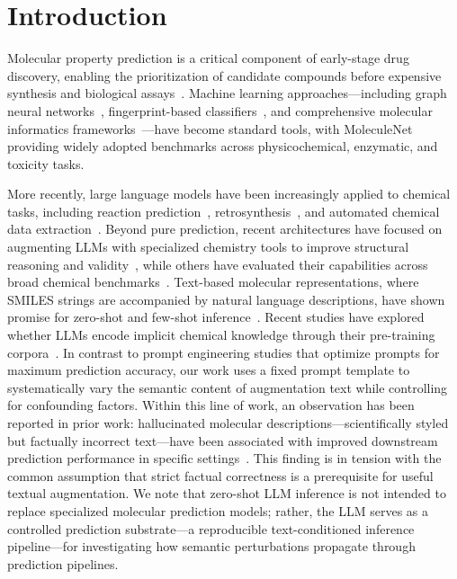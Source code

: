 \section{Introduction}

Molecular property prediction is a critical component of early-stage drug discovery, enabling the prioritization of candidate compounds before expensive synthesis and biological assays~\cite{vamathevan2019applications}. Machine learning approaches---including graph neural networks~\cite{gilmer2017neural}, fingerprint-based classifiers~\cite{rogers2010extended}, and comprehensive molecular informatics frameworks~\cite{jimenez2020drug}---have become standard tools, with MoleculeNet~\cite{wu2018moleculenet} providing widely adopted benchmarks across physicochemical, enzymatic, and toxicity tasks.

More recently, large language models have been increasingly applied to chemical tasks, including reaction prediction~\cite{schwaller2019molecular}, retrosynthesis~\cite{han2024retrosynthesis}, and automated chemical data extraction~\cite{polak2024extracting}. Beyond pure prediction, recent architectures have focused on augmenting LLMs with specialized chemistry tools to improve structural reasoning and validity~\cite{bran2024chemcrow}, while others have evaluated their capabilities across broad chemical benchmarks~\cite{guo2023benchmark, ross2022large}. Text-based molecular representations, where SMILES strings are accompanied by natural language descriptions, have shown promise for zero-shot and few-shot inference~\cite{edwards2022text2mol}. Recent studies have explored whether LLMs encode implicit chemical knowledge through their pre-training corpora~\cite{white2023assessment}. In contrast to prompt engineering studies that optimize prompts for maximum prediction accuracy, our work uses a fixed prompt template to systematically vary the semantic content of augmentation text while controlling for confounding factors. Within this line of work, an observation has been reported in prior work: hallucinated molecular descriptions---scientifically styled but factually incorrect text---have been associated with improved downstream prediction performance in specific settings~\cite{chen2023llm4mol, yuan2025hallucination}. This finding is in tension with the common assumption that strict factual correctness is a prerequisite for useful textual augmentation. We note that zero-shot LLM inference is not intended to replace specialized molecular prediction models; rather, the LLM serves as a controlled prediction substrate---a reproducible text-conditioned inference pipeline---for investigating how semantic perturbations propagate through prediction pipelines.

